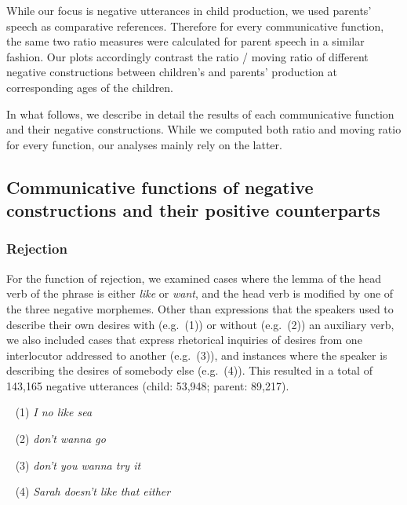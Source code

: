 \documentclass[
  english,
  man,floatsintext]{apa6}
\begin{document}
While our focus is negative utterances in child production, we used parents' speech as comparative references. Therefore for every communicative function, the same two ratio measures were calculated for parent speech in a similar fashion. Our plots accordingly contrast the ratio / moving ratio of different negative constructions between children's and parents' production at corresponding ages of the children.

In what follows, we describe in detail the results of each communicative function and their negative constructions. While we computed both ratio and moving ratio for every function, our analyses mainly rely on the latter.

\hypertarget{communicative-functions-of-negative-constructions-and-their-positive-counterparts}{%
\subsection{Communicative functions of negative constructions and their positive counterparts}\label{communicative-functions-of-negative-constructions-and-their-positive-counterparts}}

\hypertarget{rejection}{%
\subsubsection{Rejection}\label{rejection}}

For the function of rejection, we examined cases where the lemma of the head verb of the phrase is either \emph{like} or \emph{want}, and the head verb is modified by one of the three negative morphemes. Other than expressions that the speakers used to describe their own desires with (e.g.~(1)) or without (e.g.~(2)) an auxiliary verb, we also included cases that express rhetorical inquiries of desires from one interlocutor addressed to another (e.g.~(3)), and instances where the speaker is describing the desires of somebody else (e.g.~(4)). This resulted in a total of 143,165 negative utterances (child: 53,948; parent: 89,217).

~
(1) \emph{I no like sea}

~
(2) \emph{don't wanna go}

~
(3) \emph{don't you wanna try it}

~
(4) \emph{Sarah doesn't like that either}
\end{document}
